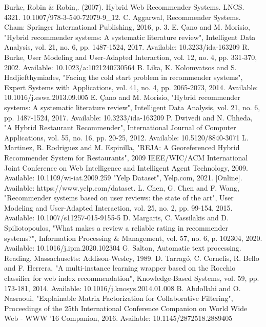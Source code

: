 \documentclass[conference]{IEEEtran}
\begin{document}
\begin{thebibliography}{00}
Burke, Robin \& Robin,. (2007). Hybrid Web Recommender Systems. LNCS. 4321. 10.1007/978-3-540-72079-9\_12.
C. Aggarwal, Recommender Systems. Cham: Springer International Publishing, 2016, p. 3.
E. Çano and M. Morisio, "Hybrid recommender systems: A systematic literature review", Intelligent Data Analysis, vol. 21, no. 6, pp. 1487-1524, 2017. Available: 10.3233/ida-163209
R. Burke, User Modeling and User-Adapted Interaction, vol. 12, no. 4, pp. 331-370, 2002. Available: 10.1023/a:1021240730564
B. Lika, K. Kolomvatsos and S. Hadjiefthymiades, "Facing the cold start problem in recommender systems", Expert Systems with Applications, vol. 41, no. 4, pp. 2065-2073, 2014. Available: 10.1016/j.eswa.2013.09.005
E. Çano and M. Morisio, "Hybrid recommender systems: A systematic literature review", Intelligent Data Analysis, vol. 21, no. 6, pp. 1487-1524, 2017. Available: 10.3233/ida-163209
P. Dwivedi and N. Chheda, "A Hybrid Restaurant Recommender", International Journal of Computer Applications, vol. 55, no. 16, pp. 20-25, 2012. Available: 10.5120/8840-3071
L. Martinez, R. Rodriguez and M. Espinilla, "REJA: A Georeferenced Hybrid Recommender System for Restaurants", 2009 IEEE/WIC/ACM International Joint Conference on Web Intelligence and Intelligent Agent Technology, 2009. Available: 10.1109/wi-iat.2009.259
"Yelp Dataset", Yelp.com, 2021. [Online]. Available: https://www.yelp.com/dataset.
L. Chen, G. Chen and F. Wang, "Recommender systems based on user reviews: the state of the art", User Modeling and User-Adapted Interaction, vol. 25, no. 2, pp. 99-154, 2015. Available: 10.1007/s11257-015-9155-5
D. Margaris, C. Vassilakis and D. Spiliotopoulos, "What makes a review a reliable rating in recommender systems?", Information Processing \& Management, vol. 57, no. 6, p. 102304, 2020. Available: 10.1016/j.ipm.2020.102304
G. Salton, Automatic text processing. Reading, Massachusetts: Addison-Wesley, 1989.
D. Tarragó, C. Cornelis, R. Bello and F. Herrera, "A multi-instance learning wrapper based on the Rocchio classifier for web index recommendation", Knowledge-Based Systems, vol. 59, pp. 173-181, 2014. Available: 10.1016/j.knosys.2014.01.008
B. Abdollahi and O. Nasraoui, "Explainable Matrix Factorization for Collaborative Filtering", Proceedings of the 25th International Conference Companion on World Wide Web - WWW '16 Companion, 2016. Available: 10.1145/2872518.2889405
\end{thebibliography}
\end{document}
